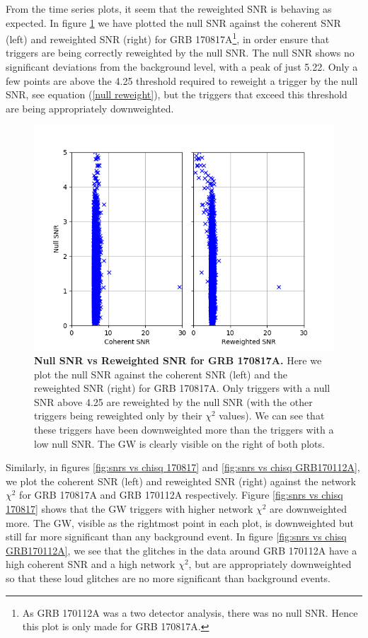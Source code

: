 \documentclass[11pt]{cuthesis}
\begin{document}
From the time series plots, it seem that the reweighted SNR is behaving as expected. In figure \ref{fig:null vs snrs 170817} we have plotted the null SNR against the coherent SNR (left) and reweighted SNR (right) for GRB 170817A\footnote{As GRB 170112A was a two detector analysis, there was no null SNR. Hence this plot is only made for GRB 170817A.}, in order ensure that triggers are being correctly reweighted by the null SNR. The null SNR shows no significant deviations from the background level, with a peak of just 5.22. Only a few points are above the 4.25 threshold required to reweight a trigger by the null SNR, see equation (\ref{null reweight}), but the triggers that exceed this threshold are being appropriately downweighted. 

\begin{figure} %
\begin{center}
\includegraphics[width=0.8\linewidth]{network_snrs_vs_null_170817.png}
\end{center}
\caption{\textbf{Null SNR vs Reweighted SNR for GRB 170817A.} Here we plot the null SNR against the coherent SNR (left) and the reweighted SNR (right) for GRB 170817A. Only triggers with a null SNR above 4.25 are reweighted by the null SNR (with the other triggers being reweighted only by their $\chi^2$ values). We can see that these triggers have been downweighted more than the triggers with a low null SNR. The GW is clearly visible on the right of both plots.} 
\label{fig:null vs snrs 170817}
\end{figure}

Similarly, in figures \ref{fig:snrs vs chisq 170817} and \ref{fig:snrs vs chisq GRB170112A}, we plot the coherent SNR (left) and reweighted SNR (right) against the network $\chi^2$ for GRB 170817A and GRB 170112A respectively. Figure \ref{fig:snrs vs chisq 170817} shows that the GW triggers with higher network $\chi^2$ are downweighted more. The GW, visible as the rightmost point in each plot, is downweighted but still far more significant than any background event. In figure \ref{fig:snrs vs chisq GRB170112A}, we see that the glitches in the data around GRB 170112A have a high coherent SNR and a high network $\chi^2$, but are appropriately downweighted so that these loud glitches are no more significant than background events. 
\end{document}
